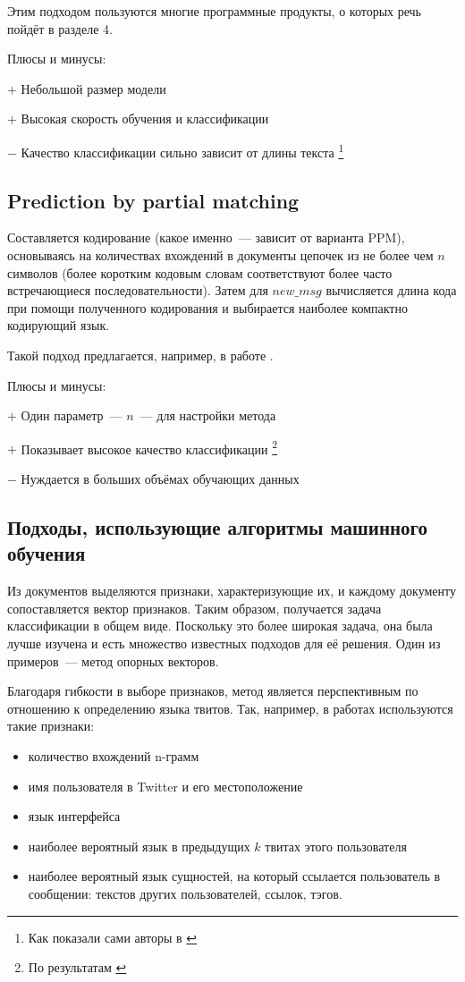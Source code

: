 \documentclass[a4paper, 14pt]{article}
\begin{document}
		Этим подходом пользуются многие программные продукты, о которых речь пойдёт
		в разделе 4.
		
		\noindent Плюсы и минусы:
		
		
		$+$ Небольшой размер модели
		
		$+$ Высокая скорость обучения и классификации
		
		$-$ Качество классификации сильно зависит от длины текста \footnote{Как показали сами авторы в \cite{canvar}}
		
		
		\subsection{Prediction by partial matching}
		Составляется кодирование (какое именно~--- зависит от варианта PPM), основываясь на количествах вхождений в документы цепочек из не более чем $n$ символов (более коротким кодовым словам соответствуют более часто встречающиеся последовательности). Затем для $new\_msg$ вычисляется длина кода при помощи полученного кодирования и выбирается наиболее
		компактно кодирующий язык.
		
		Такой подход предлагается, например, в работе \cite{ppm}.
		
		\noindent Плюсы и минусы:
		
		$+$ 	Один параметр~--- $n$~--- для настройки метода
		
		$+$ Показывает высокое качество классификации \footnote{По результатам \cite{ppm}}
		
		$-$ Нуждается в больших объёмах обучающих данных
		
		\subsection{Подходы, использующие алгоритмы машинного обучения}
		Из документов выделяются признаки, характеризующие их, и каждому документу сопоставляется вектор признаков. 
		Таким образом, получается задача классификации в общем виде. Поскольку это более широкая задача, она была
		лучше изучена и есть множество известных подходов для её решения. Один из примеров~--- 
		метод опорных векторов.
		 
		Благодаря гибкости в выборе признаков, метод является перспективным по отношению к определению языка твитов. Так, например, в работах \cite{ppm} \cite{lrev}
		используются такие признаки: 
		\begin{itemize}
			\item количество вхождений n-грамм
			\item имя пользователя в Twitter и его местоположение
			\item язык интерфейса
			\item наиболее вероятный язык в предыдущих $k$ твитах этого пользователя
			\item наиболее вероятный язык сущностей, на который ссылается пользователь в сообщении: текстов
		других пользователей, ссылок, тэгов.
		\end{itemize}		
		
\end{document}
